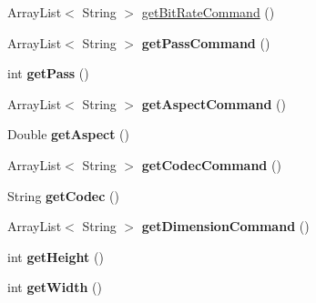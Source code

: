 \begin{DoxyCompactItemize}
\item 
ArrayList$<$ String $>$ \hyperlink{classvideo_1_1_video_profile_a53754b5c05e875826f8929217d2b11c7}{getBitRateCommand} ()
\item 
\hypertarget{classvideo_1_1_video_profile_aa2683fb200af906a6328a219bb2ae248}{
ArrayList$<$ String $>$ {\bfseries getPassCommand} ()}
\label{classvideo_1_1_video_profile_aa2683fb200af906a6328a219bb2ae248}

\item 
\hypertarget{classvideo_1_1_video_profile_ac0ccef7d4ceece3106374cd1bacbca0f}{
int {\bfseries getPass} ()}
\label{classvideo_1_1_video_profile_ac0ccef7d4ceece3106374cd1bacbca0f}

\item 
\hypertarget{classvideo_1_1_video_profile_a94541cda8a04be32e8a5ade88fefce86}{
ArrayList$<$ String $>$ {\bfseries getAspectCommand} ()}
\label{classvideo_1_1_video_profile_a94541cda8a04be32e8a5ade88fefce86}

\item 
\hypertarget{classvideo_1_1_video_profile_ae97a3876b5b3e58615f8519d97349ee8}{
Double {\bfseries getAspect} ()}
\label{classvideo_1_1_video_profile_ae97a3876b5b3e58615f8519d97349ee8}

\item 
\hypertarget{classvideo_1_1_video_profile_af8fe2807d7c04a9afbe3cdd4932c46d0}{
ArrayList$<$ String $>$ {\bfseries getCodecCommand} ()}
\label{classvideo_1_1_video_profile_af8fe2807d7c04a9afbe3cdd4932c46d0}

\item 
\hypertarget{classvideo_1_1_video_profile_a7c79a0d46880abb1b011fff4cd8b5b88}{
String {\bfseries getCodec} ()}
\label{classvideo_1_1_video_profile_a7c79a0d46880abb1b011fff4cd8b5b88}

\item 
\hypertarget{classvideo_1_1_video_profile_a05df9200386550ecd0cdd9beb2c4ccd3}{
ArrayList$<$ String $>$ {\bfseries getDimensionCommand} ()}
\label{classvideo_1_1_video_profile_a05df9200386550ecd0cdd9beb2c4ccd3}

\item 
\hypertarget{classvideo_1_1_video_profile_a84dd5a89a5d11b8f8b302dbdbd07027b}{
int {\bfseries getHeight} ()}
\label{classvideo_1_1_video_profile_a84dd5a89a5d11b8f8b302dbdbd07027b}

\item 
\hypertarget{classvideo_1_1_video_profile_ada2da6089e10d68098a275e001034945}{
int {\bfseries getWidth} ()}
\label{classvideo_1_1_video_profile_ada2da6089e10d68098a275e001034945}


\end{DoxyCompactItemize}
